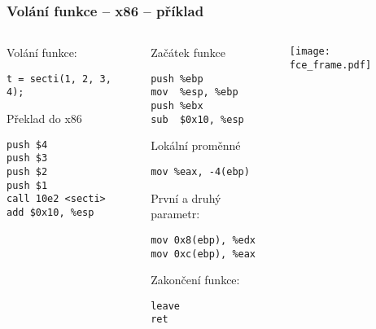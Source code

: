 \documentclass{beamer}
\begin{document}
\begin{frame}[fragile]
\frametitle{Volání funkce -- x86 -- příklad}

\begin{columns}
\begin{column}{0.35\textwidth}
Volání funkce:

\begin{verbatim}
t = secti(1, 2, 3, 4);
\end{verbatim}

Překlad do x86
\begin{verbatim}
push $4
push $3
push $2
push $1
call 10e2 <secti>
add $0x10, %esp
\end{verbatim}
\end{column}


\begin{column}{0.35\textwidth}  
Začátek funkce
\begin{verbatim}
push %ebp
mov  %esp, %ebp
push %ebx
sub  $0x10, %esp
\end{verbatim}

Lokální proměnné
\begin{verbatim}
mov %eax, -4(ebp)
\end{verbatim}

První a druhý parametr:
\begin{verbatim}
mov 0x8(ebp), %edx
mov 0xc(ebp), %eax
\end{verbatim}

Zakončení funkce:
\begin{verbatim}
leave
ret
\end{verbatim}
\end{column}

\begin{column}{0.3\textwidth}  
\texttt{[image: fce\_frame.pdf]}
\end{column}

\end{columns}
\end{frame}
\end{document}
